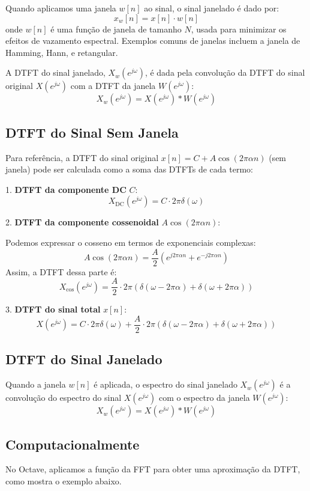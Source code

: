 Quando aplicamos uma janela \( w[n] \) ao sinal, o sinal janelado é dado por:
\[
x_w[n] = x[n] \cdot w[n]
\]
onde \( w[n] \) é uma função de janela de tamanho \( N \), usada para minimizar os efeitos de vazamento espectral. Exemplos comuns de janelas incluem a janela de Hamming, Hann, e retangular.

A DTFT do sinal janelado, \( X_w(e^{j \omega}) \), é dada pela convolução da DTFT do sinal original \( X(e^{j \omega}) \) com a DTFT da janela \( W(e^{j \omega}) \):
\[
X_w(e^{j \omega}) = X(e^{j \omega}) * W(e^{j \omega})
\]

\subsection*{DTFT do Sinal Sem Janela}

Para referência, a DTFT do sinal original \( x[n] = C + A \cos(2 \pi \alpha n) \) (sem janela) pode ser calculada como a soma das DTFTs de cada termo:

1. \textbf{DTFT da componente DC} \( C \):
   \[
   X_{\text{DC}}(e^{j \omega}) = C \cdot 2 \pi \delta(\omega)
   \]

2. \textbf{DTFT da componente cossenoidal} \( A \cos(2 \pi \alpha n) \):

   Podemos expressar o cosseno em termos de exponenciais complexas:
   \[
   A \cos(2 \pi \alpha n) = \frac{A}{2} \left( e^{j 2 \pi \alpha n} + e^{-j 2 \pi \alpha n} \right)
   \]
   Assim, a DTFT dessa parte é:
   \[
   X_{\cos}(e^{j \omega}) = \frac{A}{2} \cdot 2 \pi \left( \delta(\omega - 2 \pi \alpha) + \delta(\omega + 2 \pi \alpha) \right)
   \]

3. \textbf{DTFT do sinal total} \( x[n] \):
   \[
   X(e^{j \omega}) = C \cdot 2 \pi \delta(\omega) + \frac{A}{2} \cdot 2 \pi \left( \delta(\omega - 2 \pi \alpha) + \delta(\omega + 2 \pi \alpha) \right)
   \]

\subsection*{DTFT do Sinal Janelado}

Quando a janela \( w[n] \) é aplicada, o espectro do sinal janelado \( X_w(e^{j \omega}) \) é a convolução do espectro do sinal \( X(e^{j \omega}) \) com o espectro da janela \( W(e^{j \omega}) \):
\[
X_w(e^{j \omega}) = X(e^{j \omega}) * W(e^{j \omega})
\]

\subsection*{Computacionalmente}
No Octave, aplicamos a função da FFT para obter uma aproximação da DTFT, como mostra o exemplo abaixo.


